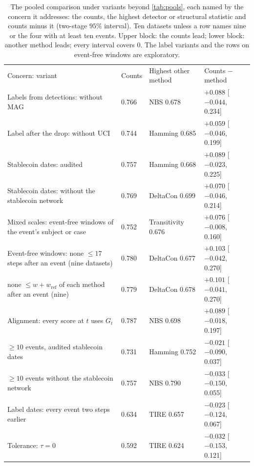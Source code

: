 \documentclass[11pt]{article}
\let\dsmidrule\midrule
\renewcommand{\midrule}{\arrayrulecolor{dsrule}\dsmidrule\arrayrulecolor{dsnavy}}
\theoremstyle{dsplain}
\theoremstyle{definition}
\begin{document}
\begin{table}[!htb]
  \centering
  \caption{The pooled comparison under variants beyond \cref{tab:pools}, each named by the concern it
  addresses: the counts, the highest detector or structural statistic and counts minus it (two-stage
  $95\%$ interval). Ten datasets unless a row names nine or the four with at least ten events. Upper
  block: the counts lead; lower block: another method leads; every interval covers $0$. The label
  variants and the rows on event-free windows are exploratory.}
  \label{tab:robust}
  \scriptsize
  \setlength{\tabcolsep}{4pt}
  \begin{tabular}{llll}
    \toprule
    Concern: variant & Counts & Highest other method & Counts $-$ method \\
    \midrule
    Labels from detections: without MAG & 0.766 & NBS 0.678 & $+0.088$ [$-0.044$, 0.234] \\
    Label after the drop: without UCI & 0.744 & Hamming 0.685 & $+0.059$ [$-0.046$, 0.199] \\
    Stablecoin dates: audited & 0.757 & Hamming 0.668 & $+0.089$ [$-0.023$, 0.225] \\
    Stablecoin dates: without the stablecoin network & 0.769 & DeltaCon 0.699 & $+0.070$ [$-0.046$, 0.214] \\
    Mixed scales: event-free windows of the event's subject or case & 0.752 & Transitivity 0.676 & $+0.076$ [$-0.008$, 0.160] \\
    Event-free windows: none $\le 17$ steps after an event (nine datasets) & 0.780 & DeltaCon 0.677 & $+0.103$ [$-0.042$, 0.270] \\
    \quad none $\le w + w_{\mathrm{ref}}$ of each method after an event (nine) & 0.779 & DeltaCon 0.678 & $+0.101$ [$-0.041$, 0.270] \\
    Alignment: every score at $t$ uses $G_t$ & 0.787 & NBS 0.698 & $+0.089$ [$-0.018$, 0.197] \\
    \midrule
    $\ge 10$ events, audited stablecoin dates & 0.731 & Hamming 0.752 & $-0.021$ [$-0.090$, 0.037] \\
    $\ge 10$ events without the stablecoin network & 0.757 & NBS 0.790 & $-0.033$ [$-0.150$, 0.055] \\
    Label dates: every event two steps earlier & 0.634 & TIRE 0.657 & $-0.023$ [$-0.124$, 0.067] \\
    Tolerance: $\tau = 0$ & 0.592 & TIRE 0.624 & $-0.032$ [$-0.153$, 0.121] \\
    \bottomrule
  \end{tabular}
\end{table}
\end{document}
